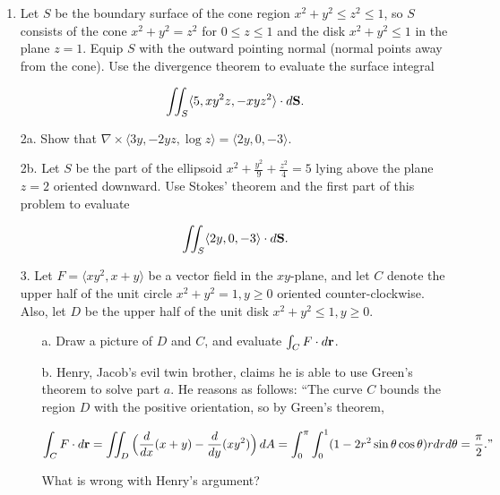 \documentclass[12 pt]{report}
\begin{document}
\newpage
\begin{enumerate}

\item Let $S$ be the boundary surface of the cone region $x^2+y^2 \leq z^2 \leq 1$, so $S$ consists of the cone $x^2+y^2 = z^2$ for $0 \leq z \leq 1$ and the disk $x^2+y^2 \leq 1$ in the plane $z=1$. Equip $S$ with the outward pointing normal (normal points away from the cone). Use the divergence theorem to evaluate the surface integral

$$\iint_S \langle 5, xy^2z, -xyz^2 \rangle \cdot d \bold{S}.$$
\newpage

\item[2a.] Show that $\nabla \times \langle 3y, -2yz, \log z \rangle = \langle 2y, 0, -3 \rangle$.

\vspace{5cm} 

\item[2b.] Let $S$ be the part of the ellipsoid $x^2+\frac{y^2}{9}+\frac{z^2}{4} = 5$ lying above the plane $z = 2$ oriented downward. Use Stokes' theorem and the first part of this problem to evaluate 

$$\iint_S \langle 2y, 0, -3 \rangle \cdot d\bold{S}.$$
 
\newpage

\item[3.] Let $F = \langle xy^2, x+y \rangle$ be a vector field in the $xy$-plane, and let $C$ denote the upper half of the unit circle $x^2+y^2 = 1, y \geq 0$ oriented counter-clockwise. Also, let $D$ be the upper half of the unit disk $x^2 + y^2 \leq 1, y \geq 0$. 
\begin{enumerate}
\item[a.] Draw a picture of $D$ and $C$, and evaluate $\int_C F \cdot d\bold{r}$. 

\vspace{7cm}

\item[b.] Henry, Jacob's evil twin brother, claims he is able to use Green's theorem to solve part $a$. He reasons as follows: ``The curve $C$ bounds the region $D$ with the positive orientation, so by Green's theorem, 

$$\int_C F \cdot d\bold{r} = \iint_D \Big(\frac{d}{dx}(x+y) - \frac{d}{dy}(xy^2) \Big) \, dA = \int_0^\pi \int_0^1 (1-2 r^2 \sin\theta \cos\theta) r dr d\theta = \frac{\pi}{2}."$$

What is wrong with Henry's argument?   

\vspace{3cm} 


\end{enumerate}
\end{enumerate}
\end{document}

